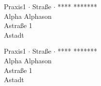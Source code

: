 \documentclass[a4paper,12pt]{letter}
\begin{document}
\vspace{2mm}

{\scriptsize { Praxis1} $\cdot$ Straße $\cdot$  **** *******}\\
Alpha Alphason\\
Astraße 1\medskip\\
Astadt

\newpage
\vspace{2mm}

{\scriptsize { Praxis1} $\cdot$ Straße $\cdot$  **** *******}\\
Alpha Alphason\\
Astraße 1\medskip\\
Astadt
\end{document}
